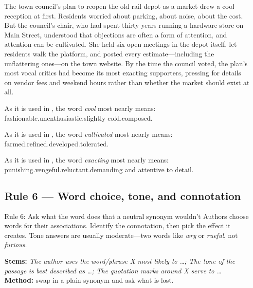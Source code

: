 \documentclass[11pt]{article}
\begin{document}
\begin{passage}
The town council's plan to reopen the old rail depot as a market drew a cool reception at first. Residents worried about parking, about noise, about the cost. But the council's chair, who had spent thirty years running a hardware store on Main Street, understood that objections are often a form of attention, and attention can be cultivated. She held six open meetings in the depot itself, let residents walk the platform, and posted every estimate---including the unflattering ones---on the town website. By the time the council voted, the plan's most vocal critics had become its most exacting supporters, pressing for details on vendor fees and weekend hours rather than whether the market should exist at all.
\end{passage}

{As it is used in , the word \emph{cool} most nearly means:}
{fashionable.}{unenthusiastic.}{slightly cold.}{composed.}

{As it is used in , the word \emph{cultivated} most nearly means:}
{farmed.}{refined.}{developed.}{tolerated.}

{As it is used in , the word \emph{exacting} most nearly means:}
{punishing.}{vengeful.}{reluctant.}{demanding and attentive to detail.}

\subsection{Rule 6 --- Word choice, tone, and connotation}
\begin{rulebox}{Rule 6: Ask what the word does that a neutral synonym wouldn't}
Authors choose words for their associations. Identify the connotation, then pick the effect it creates. Tone answers are usually moderate---two words like \emph{wry} or \emph{rueful}, not \emph{furious}.
\end{rulebox}
\textbf{Stems:} \emph{The author uses the word/phrase X most likely to \dots; The tone of the passage is best described as \dots; The quotation marks around X serve to \dots}\\
\textbf{Method:} swap in a plain synonym and ask what is lost.
\end{document}
